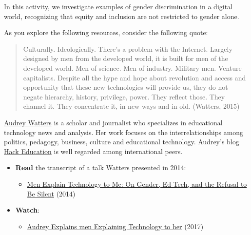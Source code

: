 \documentclass[
  letterpaper,
  DIV=11,
  numbers=noendperiod]{scrreprt}
\providecommand{\tightlist}{%
  \setlength{\itemsep}{0pt}\setlength{\parskip}{0pt}}\usepackage{longtable,booktabs,array}
\begin{document}
\begin{tcolorbox}[enhanced jigsaw, toprule=.15mm, colback=white, colframe=quarto-callout-note-color-frame, bottomtitle=1mm, leftrule=.75mm, coltitle=black, titlerule=0mm, rightrule=.15mm, colbacktitle=quarto-callout-note-color!10!white, left=2mm, title={Learning Activity}, opacitybacktitle=0.6, opacityback=0, breakable, toptitle=1mm, arc=.35mm, bottomrule=.15mm]

In this activity, we investigate examples of gender discrimination in a
digital world, recognizing that equity and inclusion are not restricted
to gender alone.

As you explore the following resources, consider the following quote:

\begin{quote}
Culturally. Ideologically. There's a problem with the Internet. Largely
designed by men from the developed world, it is built for men of the
developed world. Men of science. Men of industry. Military men. Venture
capitalists. Despite all the hype and hope about revolution and access
and opportunity that these new technologies will provide us, they do not
negate hierarchy, history, privilege, power. They reflect those. They
channel it. They concentrate it, in new ways and in old. (Watters, 2015)
\end{quote}

\href{https://audreywatters.com/}{Audrey Watters} is a scholar and
journalist who specializes in educational technology news and analysis.
Her work focuses on the interrelationships among politics, pedagogy,
business, culture and educational technology. Audrey's blog
\href{http://hackeducation.com/}{Hack Education} is well regarded among
international peers.

\begin{itemize}
\tightlist
\item
  \textbf{Read} the transcript of a talk Watters presented in 2014:

  \begin{itemize}
  \tightlist
  \item
    \href{http://hackeducation.com/2014/11/18/gender-and-ed-tech}{Men
    Explain Technology to Me: On Gender, Ed-Tech, and the Refusal to Be
    Silent} (2014)
  \end{itemize}
\item
  \textbf{Watch}:

  \begin{itemize}
  \tightlist
  \item
    \href{https://www.youtube.com/watch?v=DMjP_p01foo}{Audrey Explains
    men Explaining Technology to her} (2017)
  \end{itemize}
\end{itemize}


\end{tcolorbox}
\end{document}
